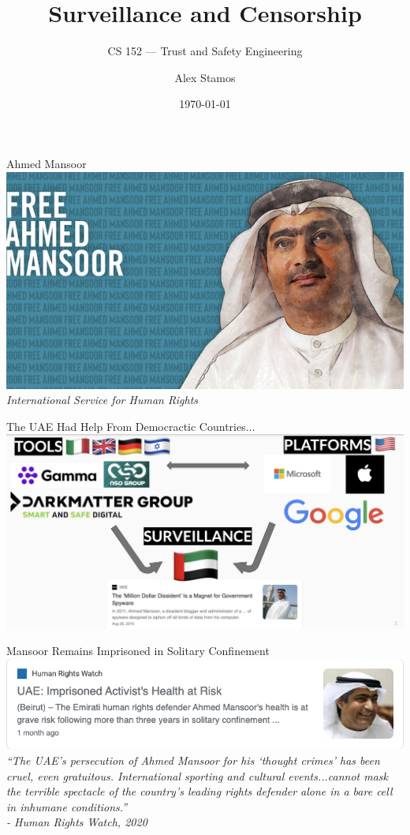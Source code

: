 \documentclass[nobackground,dvipsnames,table,aspectratio=169]{beamer}
\title{Surveillance and Censorship}
\subtitle{CS 152 --- Trust and Safety Engineering}
\author[A. Stamos]{Alex Stamos}
\institute[Stanford University]{Stanford Cyber Policy Center}
\date[2022]{\today}
\begin{document}
\begin{frame}
    \titlepage
\end{frame}

\begin{frame}{Ahmed Mansoor}
    \includegraphics[width=\textwidth]{free-ahmed-mansoor}
    \textit{International Service for Human Rights}
\end{frame}

\begin{frame}{The UAE Had Help From Democractic Countries...}
    \includegraphics[width=\textwidth]{uae-help}
\end{frame}

\begin{frame}{Mansoor Remains Imprisoned in Solitary Confinement}
    \centering
    \includegraphics[width=\textwidth]{mansoor-health-at-risk}
    \textit{“The UAE’s persecution of Ahmed Mansoor for his ‘thought crimes’ has been cruel, even gratuitous. International sporting and cultural events...cannot mask the terrible spectacle of the country’s leading rights defender alone in a bare cell in inhumane conditions.”}\\
    \small{\textit{- Human Rights Watch, 2020}}
\end{frame}
\end{document}
